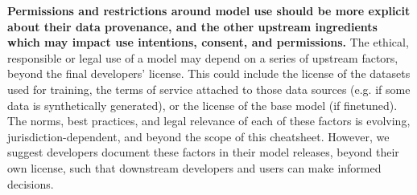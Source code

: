 \textbf{Permissions and restrictions around model use should be more explicit about their data provenance, and the other upstream ingredients which may impact use intentions, consent, and permissions.}
The ethical, responsible or legal use of a model may depend on a series of upstream factors, beyond the final developers' license. 
This could include the license of the datasets used for training, the terms of service attached to those data sources (e.g. if some data is synthetically generated), or the license of the base model (if finetuned).
The norms, best practices, and legal relevance of each of these factors is evolving, jurisdiction-dependent, and beyond the scope of this cheatsheet.
However, we suggest developers document these factors in their model releases, beyond their own license, such that downstream developers and users can make informed decisions.










% 


